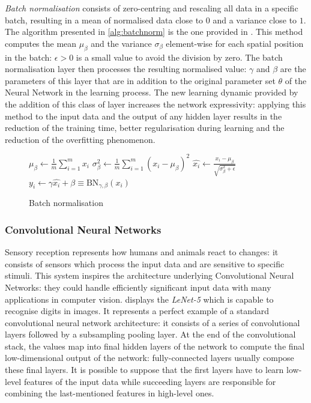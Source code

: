 \textit{Batch normalisation} consists of zero-centring and rescaling all data in a specific batch, resulting in a  mean of normalised data close to $0$ and a variance close to $1$. The algorithm presented in \vref{alg:batchnorm} is the one provided in \cite{ioffe2015batch}.
This method computes the mean $\mu_\beta$ and the variance $\sigma_\beta$  element-wise for each spatial position in the batch: $\epsilon > 0$ is a small value to avoid the division by zero.
The batch normalisation layer then processes the resulting normalised value: $\gamma$ and $\beta$ are the parameters of this layer that are in addition to the original parameter set $\theta$ of the Neural Network in the learning process.
The new learning dynamic provided by the addition of this class of layer increases the network expressivity: applying this method to the input data and the output of any hidden layer results in the reduction of the training time, better regularisation during learning and the reduction of the overfitting phenomenon.
\begin{figure}
	\begin{algorithm}[H]
		\SetAlgoLined
		\DontPrintSemicolon
		\LinesNumbered
		$\mu_\beta \leftarrow \frac{1}{m} \sum_{i=1}^{m} x_i $ 
		$\sigma_\beta^2 \leftarrow \frac{1}{m} \sum_{i=1}^{m} (x_i-\mu_\beta)^2 $ 
		$\hat{x_i} \leftarrow \frac{x_i - \mu_\beta}{\sqrt{\sigma^2_\beta + \epsilon}} $
		$y_i \leftarrow \gamma \hat{x_i} + \beta \equiv \text{BN}_{\gamma, \beta}(x_i)$
		\caption{Batch normalisation}
		\label{alg:batchnorm}
	\end{algorithm}
\end{figure}

\subsubsection{Convolutional Neural Networks}

Sensory reception represents how humans and animals react to changes: it consists of sensors which process the input data and are sensitive to specific stimuli.
This system inspires the architecture underlying Convolutional Neural Networks: they could handle efficiently significant input data with many applications in computer vision.
 displays the \textit{LeNet-5} \cite{lecun1998gradient} which is capable to recognise digits in images. It represents a perfect example of a standard convolutional neural network architecture: it consists of a series of convolutional layers followed by a subsampling pooling layer.
At the end of the convolutional stack, the values map into final hidden layers of the network to compute the final low-dimensional output of the network: fully-connected layers usually compose these final layers.
It is possible to suppose that the first layers have to learn low-level features of the input data while succeeding layers are responsible for combining the last-mentioned features in high-level ones.

